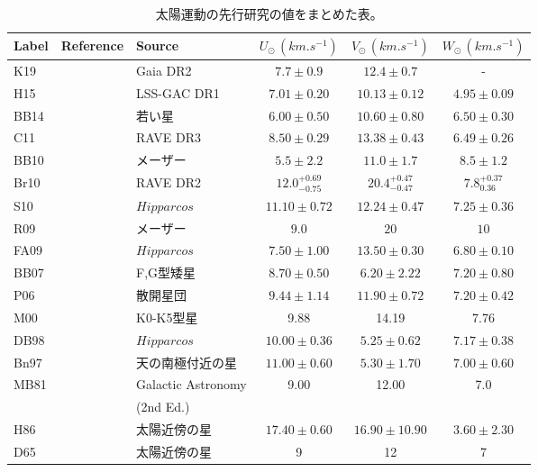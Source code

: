 \begin{table}
\begin{center}
\footnotesize
\begin{tabular}{l|l|l|c|c|c} \hline
 \rowcolor{LightCyan}
 Label & Reference & Source & $U_{\odot}\,(\si{km.s^{-1}})$ & $V_{\odot}\,(\si{km.s^{-1}})$ & $W_{\odot}\,(\si{km.s^{-1}})$\\
  \hline
  K19 & \cite{Kawata2019} & Gaia DR2 & $7.7\pm0.9$ & $12.4\pm0.7$ & -\\ 
  \hline
  H15 & \cite{Huang2015} & LSS-GAC DR1 & $7.01\pm0.20$ & $10.13\pm0.12$ & $4.95\pm0.09$\\ 
  \hline
  BB14 & \cite{Bobylev2014} & 若い星 & $6.00\pm0.50$ & $10.60\pm0.80$ & $6.50\pm0.30$\\ 
  \hline
  C11 & \cite{Coskunoglu2011} & RAVE DR3 & $8.50\pm0.29$ & $13.38\pm0.43$ & $6.49\pm0.26$\\ 
  \hline
  BB10 & \cite{Bobylev2010} & メーザー & $5.5\pm2.2$ & $11.0\pm1.7$ & $8.5\pm1.2$\\ 
  \hline
  Br10 & \cite{Breddels2010} & RAVE DR2 & $12.0 ^{+0.69} _{-0.75}$ & $20.4 ^{+0.47} _{-0.47}$ & $7.8 ^{+0.37} _{0.36}$\\ 
  \hline
  S10 & \cite{Schonrich2010} & $Hipparcos$ & $11.10\pm0.72$ & $12.24\pm0.47$ & $7.25\pm0.36$\\ 
  \hline
  R09 & \cite{Reid2009} & メーザー & $9.0$ & $20$ & $10$\\ 
  \hline
  FA09 & \cite{Francis2009} & $Hipparcos$ & $7.50\pm1.00$ & $13.50\pm0.30$ & $6.80\pm0.10$\\ 
  \hline
  BB07 & \cite{Bobylev2007} & F,G型矮星 & $8.70\pm0.50$ & $6.20\pm2.22$ & $7.20\pm0.80$\\ 
  \hline
  P06 & \cite{Piskunov2006} & 散開星団 & $9.44\pm1.14$ & $11.90\pm0.72$ & $7.20\pm0.42$\\ 
  \hline
  M00 & \cite{Mignard2000} & K0-K5型星 & 9.88 & 14.19 & 7.76\\ 
  \hline
  DB98 & \cite{DB1998} & $Hipparcos$ & $10.00\pm0.36$ & $5.25\pm0.62$ & $7.17\pm0.38$\\
  \hline
  Bn97 & \cite{Binney1997} & 天の南極付近の星 & $11.00\pm0.60$ & $5.30\pm1.70$ & $7.00\pm0.60$\\
  \hline
  \multirow{2}{*}{MB81} & \multirow{2}{*}{\cite{MB1981}} & Galactic Astronomy & \multirow{2}{*}{9.00} & \multirow{2}{*}{12.00} & \multirow{2}{*}{7.0} \\
  && (2nd Ed.) &&& \tabularnewline[\doublerulesep]
  \hline
  H86 & \cite{Homann1886} & 太陽近傍の星 & $17.40\pm0.60$ & $16.90\pm10.90$ & $3.60\pm2.30$\\
  \hline
  D65 & \cite{Delhaye1965} & 太陽近傍の星 & 9 & 12 & 7 \\
  \hline
\end{tabular}
\caption{太陽運動の先行研究の値をまとめた表。}
\label{table3}
\end{center}
\end{table}

